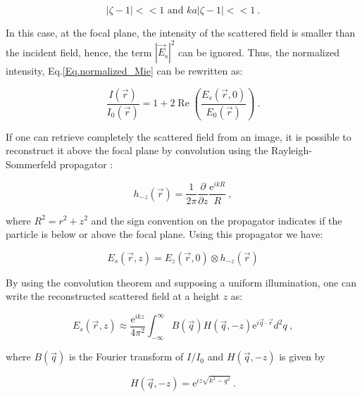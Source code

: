 \begin{equation}
	|\zeta - 1| << 1 \text{ and } ka|\zeta - 1| << 1 ~.
\end{equation}

In this case, at the focal plane, the intensity of the scattered field is smaller than the incident field, hence, the term $|\vec{E}_\mathrm{s}|^2$ can be ignored. Thus, the normalized intensity, Eq.\ref{Eq.normalized_Mie} can be rewritten as:

\begin{equation}
\frac{I(\vec{r})}{I_0(\vec{r})}= 1 + 2\operatorname{Re}\left( \frac{E_s(\vec{r},0)}{E_0(\vec{r})} \right) ~.
\end{equation}

If one can retrieve completely the scattered field from an image, it is possible to reconstruct it above the focal plane by convolution using the Rayleigh-Sommerfeld propagator \cite{goodman_introduction_2005}:

\begin{equation}
	h_{-z}(\vec{r}) = \frac{1}{2 \pi} \frac{\partial}{\partial z} \frac{\mathrm{e}^{ikR}}{R} ~,
	\label{Eq:propagator}
\end{equation}

where $ R^2 = r^2 + z^2 $ and the sign convention on the propagator indicates if the particle is below or above the focal plane. Using this propagator we have:

\begin{equation}
	E_s(\vec{r}, z) = E_z(\vec{r}, 0) \otimes h_{-z}(\vec{r})
\end{equation}

By using the convolution theorem \cite{cheong_strategies_2010, goodman_introduction_2005, sherman_application_1967,schnars_digital_1994} and supposing a uniform illumination, one can write the reconstructed scattered field at a height $z$ as:

\begin{equation}
	E_s(\vec{r}, z) \approx \frac{\mathrm{e}^{ikz}}{4\pi ^2}
	\int ^\infty _{- \infty}
	B(\vec{q}) H(\vec{q}, -z) \mathrm{e}^{i \vec{q} \cdot \vec{r}} d^2 q
	\label{Eq.RS} ~,
\end{equation}

where $B(\vec{q})$ is the Fourier transform of $I/I_0$ and $H(\vec{q}, -z)$ is given by

\begin{equation}
	H(\vec{q}, -z) = \mathrm{e}^{iz \sqrt{k^2 - q^2}} ~.
\end{equation}

